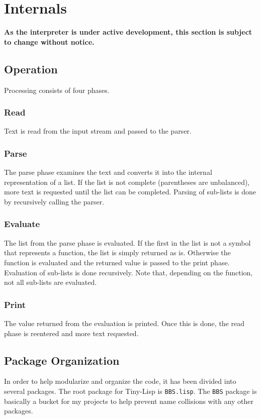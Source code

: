 \documentclass[10pt, openany]{book}
\newcommand{\package}[1]{\texttt{#1}}
\newcommand{\tl}{Tiny-Lisp}
\begin{document}
\chapter{Internals}
\textbf{As the interpreter is under active development, this section is subject to change without notice.}

\section{Operation}
Processing consists of four phases.

\subsection{Read}
Text is read from the input stream and passed to the parser.

\subsection{Parse}
The parse phase examines the text and converts it into the internal representation of a list.  If the list is not complete (parentheses are unbalanced), more text is requested until the list can be completed.  Parsing of sub-lists is done by recursively calling the parser.

\subsection{Evaluate}
The list from the parse phase is evaluated.  If the first in the list is not a symbol that represents a function, the list is simply returned as is.  Otherwise the function is evaluated and the returned value is passed to the print phase.  Evaluation of sub-lists is done recursively.  Note that, depending on the function, not all sub-lists are evaluated.

\subsection{Print}
The value returned from the evaluation is printed.  Once this is done, the read phase is reentered and more text requested.

\section{Package Organization}
In order to help modularize and organize the code, it has been divided into several packages.  The root package for \tl{} is \package{BBS.lisp}.  The \package{BBS} package is basically a bucket for my projects to help prevent name collisions with any other packages.
\end{document}
